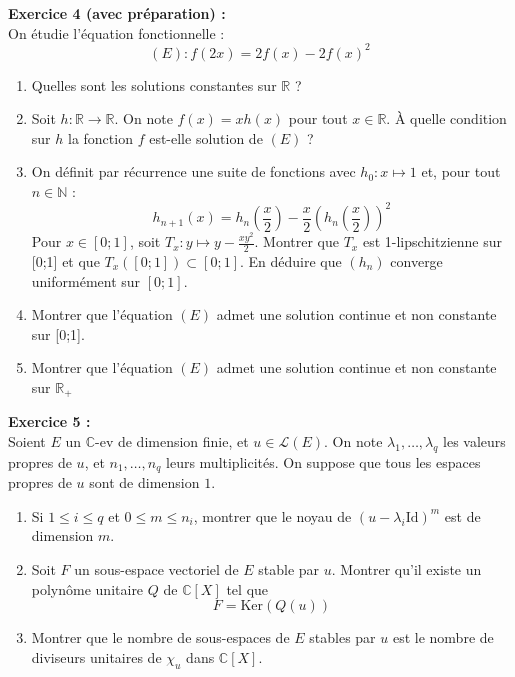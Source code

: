\documentclass[11pt,a4paper]{article}
\begin{document}
\textbf{Exercice 4 (avec préparation) :} \\
On étudie l'équation fonctionnelle : \[(E) : f(2x) = 2f(x) - 2f(x)^2\]
\begin{enumerate}
\item Quelles sont les solutions constantes sur $\mathbb{R}$ ?
\item Soit $h: \mathbb{R} \to \mathbb{R}$. On note $f(x)=xh(x)$ pour tout $x\in \mathbb{R}$. À quelle condition sur $h$ la fonction $f$ est-elle solution de $(E)$ ?
\item On définit par récurrence une suite de fonctions avec $h_0 : x \mapsto 1$ et, pour tout $n \in \mathbb{N}$ : 
\[h_{n+1}(x) = h_n\left (\frac{x}{2} \right ) - \frac{x}{2}\left ( h_n \left ( \frac{x}{2} \right ) \right )^2\]
Pour $x\in [0;1]$, soit $ \displaystyle T_x : y \mapsto y - \frac{xy^2}{2}$. Montrer que $T_x$ est 1-lipschitzienne sur [0;1] et que $T_x([0;1]) \subset [0;1]$. En déduire que $(h_n)$ converge uniformément sur $[0;1]$.
\item Montrer que l'équation $(E)$ admet une solution continue et non constante sur [0;1].
\item Montrer que l'équation $(E)$ admet une solution continue et non constante sur $\mathbb{R}_+$ \\
\end{enumerate}


\textbf{Exercice 5 :} \\
Soient $E$ un $\mathbb{C}$-ev de dimension finie, et $u \in \mathcal{L}(E)$. On note $\lambda_1, \dots, \lambda_q$ les valeurs propres de $u$, et $n_1,\dots, n_q$ leurs multiplicités. On suppose que tous les espaces propres de $u$ sont de dimension $1$.
\begin{enumerate}
\item Si $1 \leq i \leq q$ et $0 \leq m \leq n_i$, montrer que le noyau de $\left ( u - \lambda	_i\text{Id} \right)^m$ est de dimension $m$.
\item Soit $F$ un sous-espace vectoriel de $E$ stable par $u$. Montrer qu'il existe un polynôme unitaire $Q$ de $\mathbb{C}[X]$ tel que \[F=\text{Ker}\left(Q(u)\right )\]
\item Montrer que le nombre de sous-espaces de $E$ stables par $u$ est le nombre de diviseurs unitaires de $\chi_u $ dans $\mathbb{C}[X]$. \\
\end{enumerate}
\end{document}
